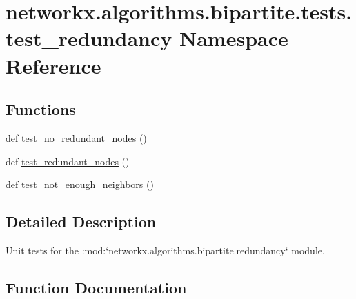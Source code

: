 \hypertarget{namespacenetworkx_1_1algorithms_1_1bipartite_1_1tests_1_1test__redundancy}{}\section{networkx.\+algorithms.\+bipartite.\+tests.\+test\+\_\+redundancy Namespace Reference}
\label{namespacenetworkx_1_1algorithms_1_1bipartite_1_1tests_1_1test__redundancy}
\subsection*{Functions}
\begin{DoxyCompactItemize}
\item 
def \hyperlink{namespacenetworkx_1_1algorithms_1_1bipartite_1_1tests_1_1test__redundancy_adfdc563c6012c3c716745ab03bb79bff}{test\+\_\+no\+\_\+redundant\+\_\+nodes} ()
\item 
def \hyperlink{namespacenetworkx_1_1algorithms_1_1bipartite_1_1tests_1_1test__redundancy_ae613e65d4442366e46f47a30b633b31a}{test\+\_\+redundant\+\_\+nodes} ()
\item 
def \hyperlink{namespacenetworkx_1_1algorithms_1_1bipartite_1_1tests_1_1test__redundancy_a143df323c0e68dd33d77e60a2cffbe51}{test\+\_\+not\+\_\+enough\+\_\+neighbors} ()
\end{DoxyCompactItemize}


\subsection{Detailed Description}
\begin{DoxyVerb}Unit tests for the :mod:`networkx.algorithms.bipartite.redundancy` module.\end{DoxyVerb}
 

\subsection{Function Documentation}
\mbox{\label{namespacenetworkx_1_1algorithms_1_1bipartite_1_1tests_1_1test__redundancy_adfdc563c6012c3c716745ab03bb79bff}} 
